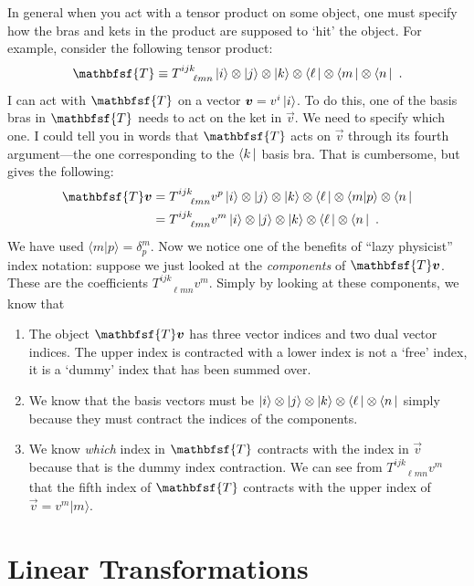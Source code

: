 \documentclass[
  11pt,
	colorful,
	raggedright,
]{tufte-style-thesis-flip}
\newcommand{\tens}[1]{\mathbfsf{#1}}
\begin{document}
In general when you act with a tensor product on some object, one must specify how the bras and kets in the product are supposed to `hit' the object. For example, consider the following tensor product:
\begin{align}
\tens{T} \equiv
  T^{ijk}_{\phantom{ijk}\ell m n}\ket{i}\otimes\ket{j}\otimes\ket{k}
  \otimes\bra{\ell}\otimes\bra{m}\otimes\bra{n} \ .
\end{align}
I can act with $\tens{T}$ on a vector $\boldsymbol{v} = v^i\left|i\right\rangle$. To do this, one of the basis bras in $\tens{T}$ needs to act on the ket in $\vec{v}$. We need to specify which one. I could tell you in words that $\tens{T}$ acts on $\vec{v}$ through its fourth argument---the one corresponding to the $\left\langle k\,\right|$ basis bra. That is cumbersome, but gives the following:
\begin{align}
  \tens{T}\vec{v} &= T^{ijk}_{\phantom{ijk}\ell m n}
  v^p
  \ket{i}\otimes\ket{j}\otimes\ket{k}
  \otimes\bra{\ell}\otimes\langle m|p\rangle\otimes\bra{n}
  \\ &=
  T^{ijk}_{\phantom{ijk}\ell m n}
  v^m
  \ket{i}\otimes\ket{j}\otimes\ket{k}
  \otimes\bra{\ell}\otimes\bra{n} \ .
\end{align}
We have used $\langle m|p\rangle = \delta^m_p$. Now we notice one of the benefits of ``lazy physicist'' index notation: suppose we just looked at the \emph{components} of $\tens{T}\vec{v}$. These are the coefficients $T^{ijk}_{\phantom{ijk}\ell m n}v^m$. Simply by looking at these components, we know that
\begin{enumerate}
  \item The object $\tens{T}\vec{v}$ has three vector indices and two dual vector indices. The upper index is contracted with a lower index is not a `free' index, it is a `dummy' index that has been summed over. 
  \item We know that the basis vectors must be $\left|i\right\rangle\otimes\left|j\right\rangle\otimes\left|k\right\rangle
  \otimes\left\langle\ell\,\right|\otimes\left\langle n\,\right|$ simply because they must contract the indices of the components.
  \item We know \emph{which} index in $\tens{T}$ contracts with the index in $\vec{v}$ because that is the dummy index contraction. We can see from $T^{ijk}_{\phantom{ijk}\ell m n}v^m$ that the fifth index of $\tens{T}$ contracts with the upper index of $\vec{v}=v^m |m\rangle$.
\end{enumerate}




\section{Linear Transformations}
\label{sec:linear:transformations}
\end{document}
